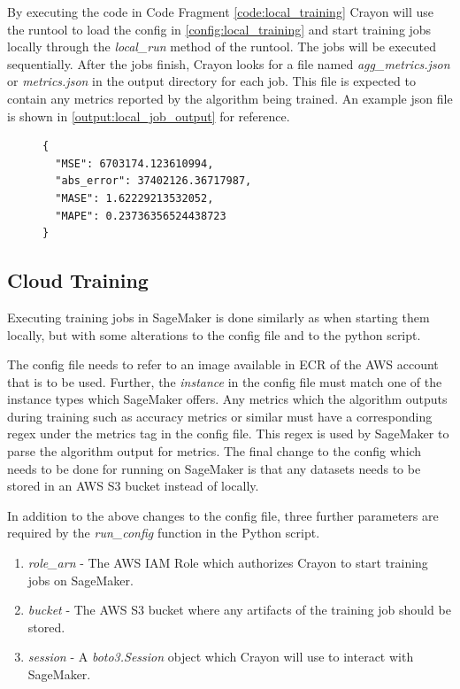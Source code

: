 By executing the code in Code Fragment \ref{code:local_training} Crayon will use the runtool to load the config in \ref{config:local_training} and start training jobs locally through the \textit{local\_run} method of the runtool. The jobs will be executed sequentially. After the jobs finish, Crayon looks for a file named \textit{agg\_metrics.json} or \textit{metrics.json} in the output directory for each job. This file is expected to contain any metrics reported by the algorithm being trained. An example json file is shown in \ref{output:local_job_output} for reference.

\begin{figure}
  \begin{lstlisting}[label={output:local_job_output}, caption=Example of a training job output file such as \textit{metrics.json} or \textit{agg\_metrics.json}]
{
  "MSE": 6703174.123610994,
  "abs_error": 37402126.36717987,
  "MASE": 1.62229213532052,
  "MAPE": 0.23736356524438723
}
\end{lstlisting}
\end{figure}


\subsection{Cloud Training}
\label{sec:cloud_training}
Executing training jobs in SageMaker is done similarly as when starting them locally, but with some alterations to the config file and to the python script.

The config file needs to refer to an image available in ECR of the AWS account that is to be used. Further, the \textit{instance} in the config file must match one of the instance types which SageMaker offers. Any metrics which the algorithm outputs during training such as accuracy metrics or similar must have a corresponding regex under the metrics tag in the config file. This regex is used by SageMaker to parse the algorithm output for metrics. The final change to the config which needs to be done for running on SageMaker is that any datasets needs to be stored in an AWS S3 bucket instead of locally.

In addition to the above changes to the config file, three further parameters are required by the \textit{run\_config} function in the Python script.

\begin{enumerate}
  \item \textit{role\_arn} - The AWS IAM Role  which authorizes Crayon to start training jobs on SageMaker.
  \item \textit{bucket} - The AWS S3 bucket where any artifacts of the training job should be stored.
  \item \textit{session} - A \textit{boto3.Session} object which Crayon will use to interact with SageMaker.
\end{enumerate}

